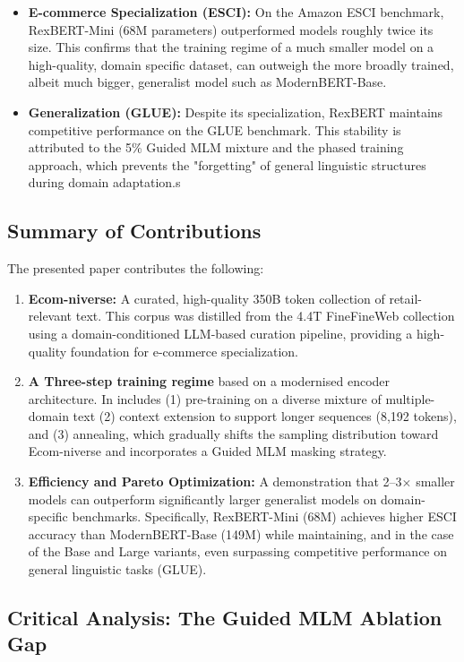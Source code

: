 \documentclass[a4paper,12pt]{article}
\begin{document}
\begin{itemize}
    \item \textbf{E-commerce Specialization (ESCI):} On the Amazon ESCI benchmark, RexBERT-Mini (68M parameters) outperformed models roughly twice its size. This confirms that the training regime of a much smaller model on a high-quality, domain specific dataset, can outweigh the more broadly trained, albeit much bigger, generalist model such as ModernBERT-Base.
    \item \textbf{Generalization (GLUE):} Despite its specialization, RexBERT maintains competitive performance on the GLUE benchmark. This stability is attributed to the 5\% Guided MLM mixture and the phased training approach, which prevents the "forgetting" of general linguistic structures during domain adaptation.s
\end{itemize}

\subsection{Summary of Contributions}
The presented paper contributes the following:

\begin{enumerate}
    \item \textbf{Ecom-niverse:} A curated, high-quality 350B token collection of retail-relevant text. This corpus was distilled from the 4.4T FineFineWeb collection using a domain-conditioned LLM-based curation pipeline, providing a high-quality foundation for e-commerce specialization.
    \item \textbf{A Three-step training regime} based on a modernised encoder architecture. In includes (1) pre-training on a diverse mixture of multiple-domain text (2) context extension to support longer sequences (8,192 tokens), and (3) annealing, which gradually shifts the sampling distribution toward Ecom-niverse and incorporates a Guided MLM masking strategy.
    \item \textbf{Efficiency and Pareto Optimization:} A demonstration that 2--3$\times$ smaller models can outperform significantly larger generalist models on domain-specific benchmarks. Specifically, RexBERT-Mini (68M) achieves higher ESCI accuracy than ModernBERT-Base (149M) while maintaining, and in the case of the Base and Large variants, even surpassing competitive performance on general linguistic tasks (GLUE).
\end{enumerate}

\subsection{Critical Analysis: The Guided MLM Ablation Gap}
\end{document}
